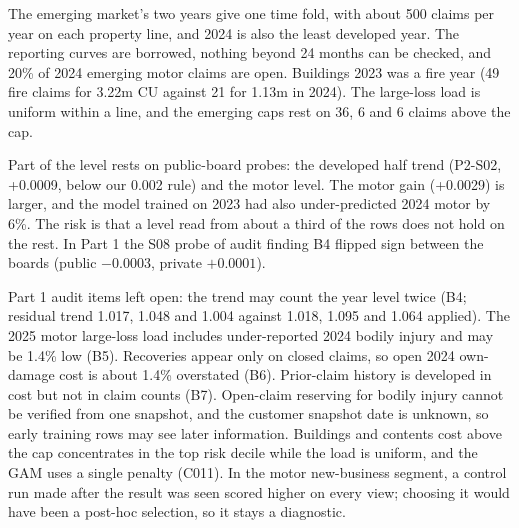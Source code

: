 \documentclass[11pt,a4paper]{article}
\begin{document}
The emerging market's two years give one time fold, with about 500 claims per year on each property line, and 2024 is
also the least developed year. The reporting curves are borrowed, nothing beyond 24 months can be checked, and 20\% of
2024 emerging motor claims are open. Buildings 2023 was a fire year (49 fire claims for 3.22m CU against 21 for 1.13m
in 2024). The large-loss load is uniform within a line, and the emerging caps rest on 36, 6 and 6 claims above the cap.

Part of the level rests on public-board probes: the developed half trend (P2-S02, +0.0009, below our 0.002 rule) and
the motor level. The motor gain (+0.0029) is larger, and the model trained on 2023 had also under-predicted 2024
motor by 6\%. The risk is that a level read from about a third of the rows does not hold on the rest. In Part 1 the S08 probe of audit finding B4 flipped sign between the boards (public
$-0.0003$, private $+0.0001$).

Part 1 audit items left open: the trend may count the year level twice (B4; residual trend 1.017, 1.048 and 1.004
against 1.018, 1.095 and 1.064 applied). The 2025 motor large-loss load includes under-reported 2024 bodily injury and
may be 1.4\% low (B5). Recoveries appear only on closed claims, so open 2024 own-damage cost is about 1.4\% overstated
(B6). Prior-claim history is developed in cost but not in claim counts (B7). Open-claim reserving for bodily injury
cannot be verified from one snapshot, and the customer snapshot date is unknown, so early training rows may see later
information. Buildings and contents cost above the cap concentrates in the top risk decile while the load is uniform,
and the GAM uses a single penalty (C011). In the motor new-business segment, a control run made after the result was
seen scored higher on every view; choosing it would have been a post-hoc selection, so it stays a diagnostic.
\end{document}
